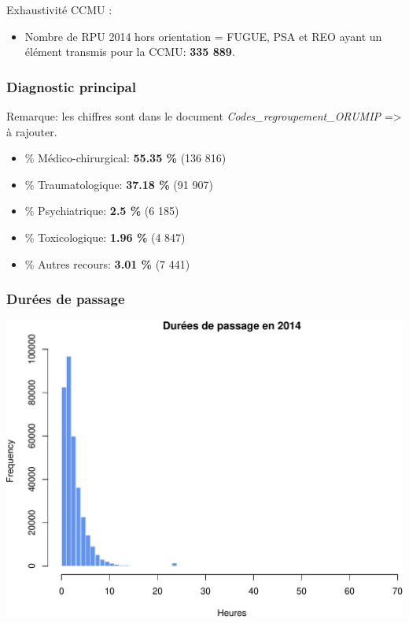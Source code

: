 \documentclass[]{article}
\begin{document}
Exhaustivité CCMU :

\begin{itemize}
\itemsep1pt\parskip0pt
\item
  Nombre de RPU 2014 hors orientation = FUGUE, PSA et REO ayant un
  élément transmis pour la CCMU: \textbf{335 889}.
\end{itemize}

\subsubsection{Diagnostic principal}\label{diagnostic-principal}

Remarque: les chiffres sont dans le document
\emph{Codes\_regroupement\_ORUMIP} =\textgreater{} à rajouter.

\begin{itemize}
\itemsep1pt\parskip0pt
\item
  \% Médico-chirurgical: \textbf{55.35 \%} (136 816)
\item
  \% Traumatologique: \textbf{37.18 \%} (91 907)
\item
  \% Psychiatrique: \textbf{2.5 \%} (6 185)
\item
  \% Toxicologique: \textbf{1.96 \%} (4 847)
\item
  \% Autres recours: \textbf{3.01 \%} (7 441)
\end{itemize}

\subsubsection{Durées de passage}\label{durees-de-passage}

\includegraphics{rapport2014_V4_files/figure-latex/passages-1.pdf}
\end{document}

